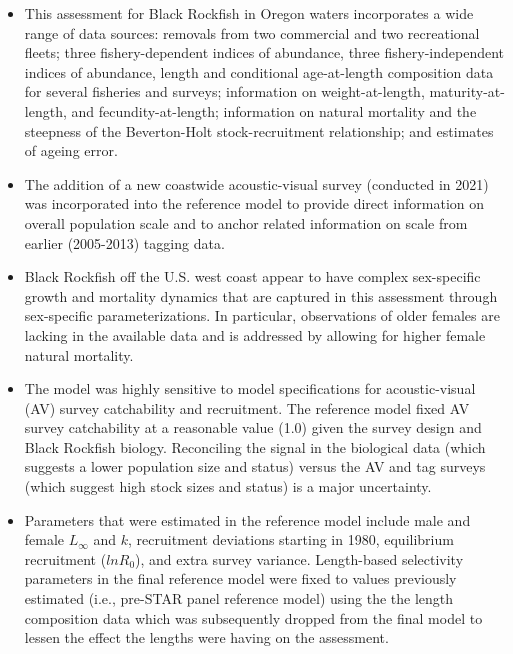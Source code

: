 \documentclass[11pt,
  letterpaper,
]{article}
\begin{document}
\begin{itemize}

\item This assessment for Black Rockfish in Oregon waters incorporates a wide range of data sources: removals from two commercial and two recreational fleets; three fishery-dependent indices of abundance, three fishery-independent indices of abundance, length and conditional age-at-length composition data for several fisheries and surveys; information on weight-at-length, maturity-at-length, and fecundity-at-length; information on natural mortality and the steepness of the Beverton-Holt stock-recruitment relationship; and estimates of ageing error.

\item The addition of a new coastwide acoustic-visual survey (conducted in 2021) was incorporated into the reference model to provide direct information on overall population scale and to anchor related information on scale from earlier (2005-2013) tagging data.   

\item Black Rockfish off the U.S. west coast appear to have complex sex-specific growth and mortality dynamics that are captured in this assessment through sex-specific parameterizations. In particular, observations of older females are lacking in the available data and is addressed by allowing for higher female natural mortality.

\item The model was highly sensitive to model specifications for acoustic-visual (AV) survey catchability and recruitment. The reference model fixed AV survey catchability at a reasonable value (1.0) given the survey design and Black Rockfish biology. Reconciling the signal in the
biological data (which suggests a lower population size and status) versus the AV and tag surveys (which suggest high stock sizes and status) is a major uncertainty.

\item Parameters that were estimated in the reference model include male and female $L_{\infty}$ and $k$, recruitment deviations starting in 1980, equilibrium recruitment ($lnR_0$), and extra survey variance.  Length-based selectivity parameters in the final reference model were fixed to values previously estimated (i.e., pre-STAR panel reference model) using the the length composition data which was subsequently dropped from the final model to lessen the effect the lengths were having on the assessment.


\end{itemize}
\end{document}
